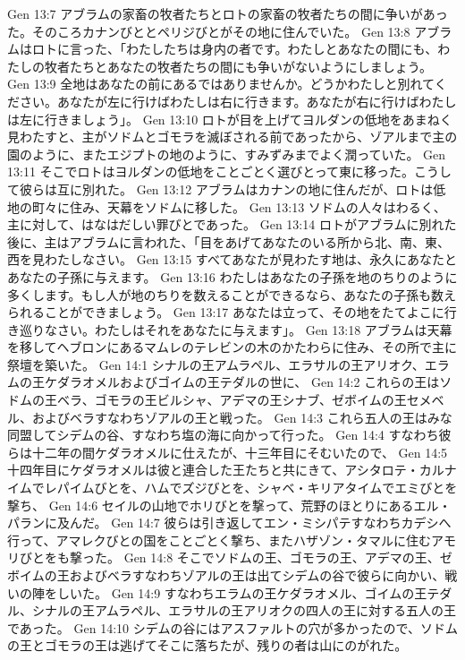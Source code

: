 Gen 13:7  アブラムの家畜の牧者たちとロトの家畜の牧者たちの間に争いがあった。そのころカナンびととペリジびとがその地に住んでいた。
Gen 13:8  アブラムはロトに言った、「わたしたちは身内の者です。わたしとあなたの間にも、わたしの牧者たちとあなたの牧者たちの間にも争いがないようにしましょう。
Gen 13:9  全地はあなたの前にあるではありませんか。どうかわたしと別れてください。あなたが左に行けばわたしは右に行きます。あなたが右に行けばわたしは左に行きましょう」。
Gen 13:10  ロトが目を上げてヨルダンの低地をあまねく見わたすと、主がソドムとゴモラを滅ぼされる前であったから、ゾアルまで主の園のように、またエジプトの地のように、すみずみまでよく潤っていた。
Gen 13:11  そこでロトはヨルダンの低地をことごとく選びとって東に移った。こうして彼らは互に別れた。
Gen 13:12  アブラムはカナンの地に住んだが、ロトは低地の町々に住み、天幕をソドムに移した。
Gen 13:13  ソドムの人々はわるく、主に対して、はなはだしい罪びとであった。
Gen 13:14  ロトがアブラムに別れた後に、主はアブラムに言われた、「目をあげてあなたのいる所から北、南、東、西を見わたしなさい。
Gen 13:15  すべてあなたが見わたす地は、永久にあなたとあなたの子孫に与えます。
Gen 13:16  わたしはあなたの子孫を地のちりのように多くします。もし人が地のちりを数えることができるなら、あなたの子孫も数えられることができましょう。
Gen 13:17  あなたは立って、その地をたてよこに行き巡りなさい。わたしはそれをあなたに与えます」。
Gen 13:18  アブラムは天幕を移してヘブロンにあるマムレのテレビンの木のかたわらに住み、その所で主に祭壇を築いた。
Gen 14:1  シナルの王アムラペル、エラサルの王アリオク、エラムの王ケダラオメルおよびゴイムの王テダルの世に、
Gen 14:2  これらの王はソドムの王ベラ、ゴモラの王ビルシャ、アデマの王シナブ、ゼボイムの王セメベル、およびベラすなわちゾアルの王と戦った。
Gen 14:3  これら五人の王はみな同盟してシデムの谷、すなわち塩の海に向かって行った。
Gen 14:4  すなわち彼らは十二年の間ケダラオメルに仕えたが、十三年目にそむいたので、
Gen 14:5  十四年目にケダラオメルは彼と連合した王たちと共にきて、アシタロテ・カルナイムでレパイムびとを、ハムでズジびとを、シャベ・キリアタイムでエミびとを撃ち、
Gen 14:6  セイルの山地でホリびとを撃って、荒野のほとりにあるエル・パランに及んだ。
Gen 14:7  彼らは引き返してエン・ミシパテすなわちカデシへ行って、アマレクびとの国をことごとく撃ち、またハザゾン・タマルに住むアモリびとをも撃った。
Gen 14:8  そこでソドムの王、ゴモラの王、アデマの王、ゼボイムの王およびベラすなわちゾアルの王は出てシデムの谷で彼らに向かい、戦いの陣をしいた。
Gen 14:9  すなわちエラムの王ケダラオメル、ゴイムの王テダル、シナルの王アムラペル、エラサルの王アリオクの四人の王に対する五人の王であった。
Gen 14:10  シデムの谷にはアスファルトの穴が多かったので、ソドムの王とゴモラの王は逃げてそこに落ちたが、残りの者は山にのがれた。
